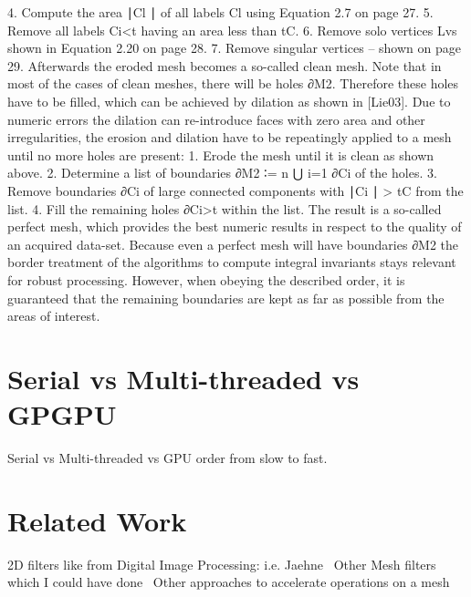 \documentclass[openany]{book}
\begin{document}
4. Compute the area ∣Cl ∣ of all labels Cl using Equation 2.7 on page 27.
5. Remove all labels Ci<t having an area less than tC.
6. Remove solo vertices Lvs shown in Equation 2.20 on page 28.
7. Remove singular vertices – shown on page 29.
Afterwards the eroded mesh becomes a so-called clean mesh. Note that in most of 
the cases of clean meshes, there will be holes ∂M2. Therefore these holes have 
to be filled, which can be achieved by dilation as shown in [Lie03]. Due to 
numeric errors the dilation can re-introduce faces with zero area and other 
irregularities, the erosion and dilation have to be repeatingly applied to a mesh 
until no more holes are present:
1. Erode the mesh until it is clean as shown above.
2. Determine a list of boundaries ∂M2 ∶= n ⋃ i=1 ∂Ci of the holes.
3. Remove boundaries ∂Ci of large connected components with ∣Ci ∣ > tC from the 
list.
4. Fill the remaining holes ∂Ci>t within the list.
The result is a so-called perfect mesh, which provides the best numeric results 
in respect to the quality of an acquired data-set. Because even a perfect mesh 
will have boundaries ∂M2 the border treatment of the algorithms to compute 
integral invariants stays relevant for robust processing. However, when obeying 
the described order, it is guaranteed that the remaining boundaries are kept as 
far as possible from the areas of interest.~\cite[p.~120]{Mara12}



\section{Serial vs Multi-threaded vs GPGPU}
Serial vs Multi-threaded vs GPU order from slow to fast.~\cite[p.~00]{SourceNeeded}



\section{Related Work}
2D filters like from Digital Image Processing: i.e. Jaehne~\cite[p.~00]{SourceNeeded}
Other Mesh filters which I could have done~\cite[p.~00]{SourceNeeded}
Other approaches to accelerate operations on a mesh~\cite[p.~00]{SourceNeeded}



\end{document}
